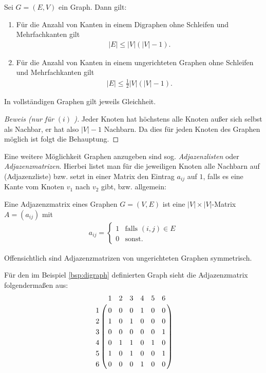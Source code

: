 \begin{proposition}
  Sei $G=(E, V)$ ein Graph. Dann gilt:
  \begin{enumerate}[label=(\roman*)]
  \item Für die Anzahl von Kanten in einem Digraphen ohne Schleifen
    und Mehrfachkanten gilt
    \begin{gather*}
      |E| \le |V|(|V| - 1).
    \end{gather*}

  \item Für die Anzahl von Kanten in einem ungerichteten Graphen ohne
    Schleifen und Mehrfachkanten gilt
    \begin{gather*}
      |E| \le \frac{1}{2} |V|(|V| - 1).
    \end{gather*}
  \end{enumerate}
  In vollständigen Graphen gilt jeweils Gleichheit.
\end{proposition}

\begin{proof}[Beweis (nur für $(i)$ )]
  Jeder Knoten hat höchstens alle Knoten außer sich selbst als
  Nachbar, er hat also $|V| - 1$ Nachbarn. Da dies für jeden Knoten
  des Graphen möglich ist folgt die Behauptung.
\end{proof}

Eine weitere Möglichkeit Graphen anzugeben sind
sog. \emph{Adjazenzlisten} oder \emph{Adjazenzmatrizen}. Hierbei
listet man für die jeweiligen Knoten alle Nachbarn auf (Adjazenzliste)
bzw. setzt in einer Matrix den Eintrag $a_{ij}$ auf $1$, falls es eine
Kante vom Knoten $v_1$ nach $v_2$ gibt, bzw. allgemein:
\begin{defi}[Adjazenzmatrix]
  Eine Adjazenzmatrix eines Graphen $G=(V,E)$ ist eine
  $|V| \times |V|$-Matrix $A = (a_{ij})$ mit
  \begin{gather*}
    a_{ij} = \begin{cases}
      1 & \text{falls } (i,j) \in E \\
      0 & \text{sonst.}
    \end{cases}
  \end{gather*}
\end{defi}

\begin{anm}
  Offensichtlich sind Adjazenzmatrizen von ungerichteten Graphen
  symmetrisch.
\end{anm}

Für den im Beispiel \ref{bsp:digraph} definierten Graph sieht die
Adjazenzmatrix folgendermaßen aus:
\begin{gather*}
  \bordermatrix{ & 1 & 2 & 3 & 4 & 5 & 6 \cr 1 & 0 & 0 & 0 & 1 & 0 & 0
    \cr 2 & 1 & 0 & 1 & 0 & 0 & 0 \cr 3 & 0 & 0 & 0 & 0 & 0 & 1 \cr 4
    & 0 & 1 & 1 & 0 & 1 & 0 \cr 5 & 1 & 0 & 1 & 0 & 0 & 1 \cr 6 & 0 &
    0 & 0 & 1 & 0 & 0 \cr }
\end{gather*}

